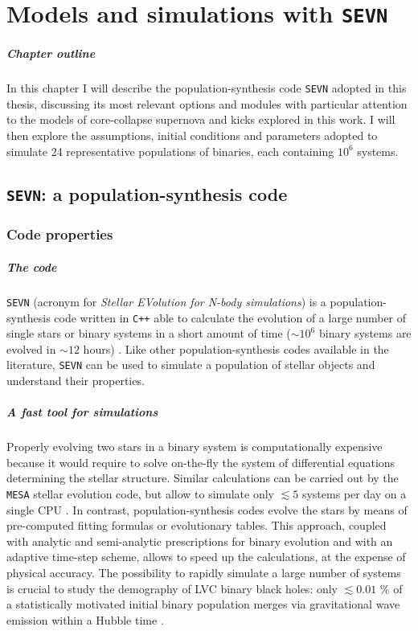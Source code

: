 \documentclass[a4paper,titlepage]{book}     	%
\begin{document}
\chapter{Models and simulations with \texttt{SEVN}}
\paragraph{Chapter outline} In this chapter I will describe the population-synthesis code \texttt{SEVN} adopted in this thesis, discussing its most relevant options and modules with particular attention to the models of core-collapse supernova and kicks explored in this work. I will then explore the assumptions, initial conditions and parameters adopted to simulate 24 representative populations of binaries, each containing $10^6$ systems.


\section{\texttt{SEVN}: a population-synthesis code}\label{sec:SEVN}
\subsection{Code properties}\label{subsec:SEVNproperties}
\paragraph{The code} \texttt{SEVN} (acronym for \emph{Stellar EVolution for N-body simulations}) is a population-synthesis code written in \texttt{C++} able to calculate the evolution of a large number of single stars or binary systems in a short amount of time ($\sim 10^{6}$ binary systems are evolved in $\sim 12$ hours) \cite{spera2019_mergingBBH}. Like other population-synthesis codes available in the literature, \texttt{SEVN} can be used to simulate a population of stellar objects and understand their properties.

\paragraph{A fast tool for simulations} Properly evolving two stars in a binary system is computationally expensive because it would require to solve on-the-fly the system of differential equations determining the stellar structure. Similar calculations can be carried out by the \texttt{MESA} stellar evolution code, but allow to simulate only $\lesssim 5$ systems per day on a single CPU \cite{MESA2015BinaryMT}. In contrast, population-synthesis codes evolve the stars by means of pre-computed fitting formulas or evolutionary tables. This approach, coupled with analytic and semi-analytic prescriptions for binary evolution and with an adaptive time-step scheme, allows to speed up the calculations, at the expense of physical accuracy. The possibility to rapidly simulate a large number of systems is crucial to study the  demography of LVC binary black holes: only $\lesssim 0.01$ \% of a statistically motivated initial binary population merges via gravitational wave emission within a Hubble time \cite{spera2019_mergingBBH}.
\end{document}
